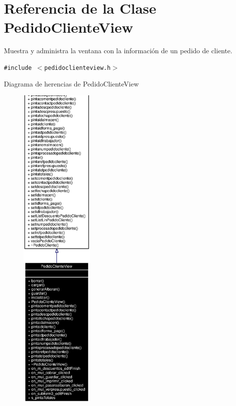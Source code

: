 \section{Referencia de la Clase Pedido\-Cliente\-View}
\label{classPedidoClienteView}
Muestra y administra la ventana con la informaci\'{o}n de un pedido de cliente.  


{\tt \#include $<$pedidoclienteview.h$>$}

Diagrama de herencias de Pedido\-Cliente\-View\begin{figure}[H]
\begin{center}
\leavevmode
\includegraphics[width=103pt]{classPedidoClienteView__inherit__graph}
\end{center}
\end{figure}
